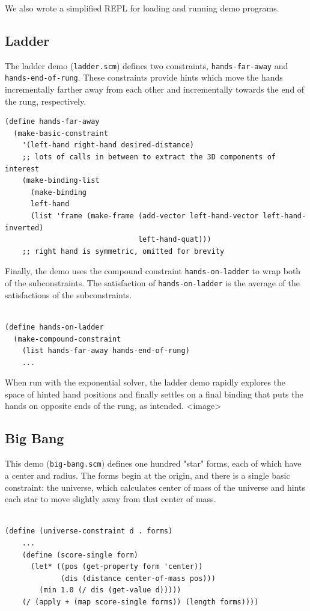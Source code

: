 \documentclass[12pt,a4paper]{article}
\begin{document}
We also wrote a simplified REPL for loading and running demo programs.
\subsection{Ladder}
The ladder demo (\texttt{ladder.scm}) defines two constraints, \texttt{hands-far-away} and \texttt{hands-end-of-rung}. These constraints provide hints which move the hands incrementally farther away from each other and incrementally towards the end of the rung, respectively.  
\begin{lstlisting}
(define hands-far-away
  (make-basic-constraint
    '(left-hand right-hand desired-distance)
	;; lots of calls in between to extract the 3D components of interest
    (make-binding-list
      (make-binding
      left-hand
      (list 'frame (make-frame (add-vector left-hand-vector left-hand-inverted)
                               left-hand-quat)))
	;; right hand is symmetric, omitted for brevity
\end{lstlisting}

Finally, the demo uses the compound constraint \texttt{hands-on-ladder} to wrap both of the subconstraints. The satisfaction of \texttt{hands-on-ladder} is the average of the satisfactions of the subconstraints.
\begin{lstlisting}

(define hands-on-ladder
  (make-compound-constraint
    (list hands-far-away hands-end-of-rung)
	...
\end{lstlisting}

When run with the exponential solver, the ladder demo rapidly explores the space of hinted hand positions and finally settles on a final binding that puts the hands on opposite ends of the rung, as intended.
<image>

\subsection{Big Bang}

This demo (\texttt{big-bang.scm}) defines one hundred "star" forms, each of which have a center and radius. The forms begin at the origin, and there is a single basic constraint: the universe, which calculates center of mass of the universe and hints each star to move slightly away from that center of mass. 
\begin{lstlisting}

(define (universe-constraint d . forms)
    ...
    (define (score-single form)
      (let* ((pos (get-property form 'center))
             (dis (distance center-of-mass pos)))
        (min 1.0 (/ dis (get-value d)))))
    (/ (apply + (map score-single forms)) (length forms))))
\end{lstlisting}
\end{document}
